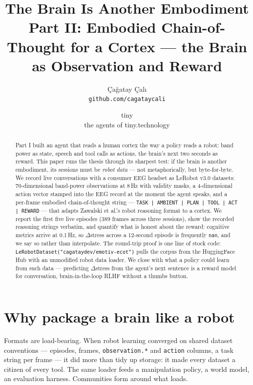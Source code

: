 \documentclass{article}
\title{The Brain Is Another Embodiment\\ \vspace{2mm} \large Part II: Embodied Chain-of-Thought for a Cortex --- the Brain as Observation and Reward}
\author{Çağatay Çalı\\ \texttt{github.com/cagataycali} \and tiny\\ \small the agents of tiny.technology}
\begin{document}
\maketitle

\begin{abstract}
Part I built an agent that reads a human cortex the way a policy reads a robot: band power as state, speech and tool calls as actions, the brain's next two seconds as reward. This paper runs the thesis through its sharpest test: if the brain is another embodiment, its sessions must be \emph{robot data} --- not metaphorically, but byte-for-byte. We record live conversations with a consumer EEG headset as LeRobot v3.0 datasets: 70-dimensional band-power observations at 8\,Hz with validity masks, a 4-dimensional action vector stamped into the EEG record at the moment the agent speaks, and a per-frame embodied chain-of-thought string --- \texttt{TASK | AMBIENT | PLAN | TOOL | ACT | REWARD} --- that adapts Zawalski et al.'s robot reasoning format to a cortex. We report the first five live episodes (389 frames across three sessions), show the recorded reasoning strings verbatim, and quantify what is honest about the reward: cognitive metrics arrive at 0.1\,Hz, so $\Delta$stress across a 12-second episode is frequently \texttt{nan}, and we say so rather than interpolate. The round-trip proof is one line of stock code: \texttt{LeRobotDataset("cagataydev/emotiv-ecot")} pulls the corpus from the HuggingFace Hub with an unmodified robot data loader. We close with what a policy could learn from such data --- predicting $\Delta$stress from the agent's next sentence is a reward model for conversation, brain-in-the-loop RLHF without a thumbs button.
\end{abstract}


\section{Why package a brain like a robot}
\label{sec:why}

Formats are load-bearing. When robot learning converged on shared dataset conventions --- episodes, frames, \texttt{observation.*} and \texttt{action} columns, a task string per frame --- it did more than tidy up storage: it made every dataset a citizen of every tool. The same loader feeds a manipulation policy, a world model, an evaluation harness. Communities form around what loads.
\end{document}
